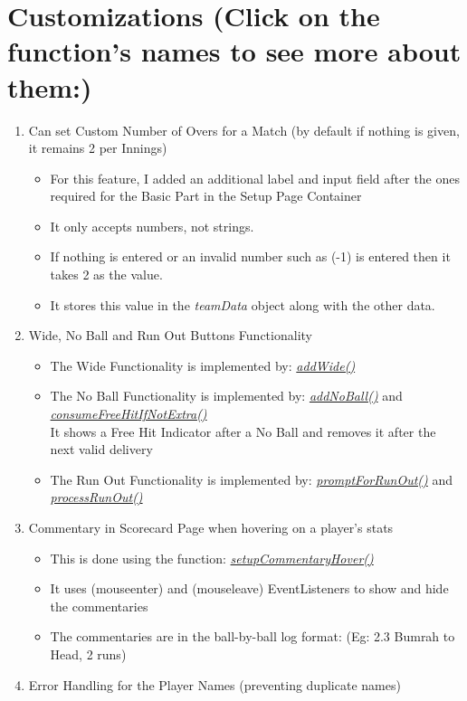 \documentclass[a4paper,12pt]{article}
\begin{document}
\section{Customizations (Click on the function's names to see more about them:)}
\begin{enumerate}
\item Can set Custom Number of Overs for a Match (by default if nothing is given, it remains 2 per Innings)
  \begin{itemize}
  \item For this feature, I added an additional label and input field after the ones required for the Basic Part in the Setup Page Container
  \item It only accepts numbers, not strings.
  \item If nothing is entered or an invalid number such as (-1) is entered then it takes 2 as the value.
  \item It stores this value in the \textit{teamData} object along with the other data.
  \end{itemize}
\item Wide, No Ball and Run Out Buttons Functionality 
  \begin{itemize}
  \item The Wide Functionality is implemented by: \hyperref[wide]{\textit{addWide()}} 
  \item The No Ball Functionality is implemented by: \hyperref[noBall1]{\textit{addNoBall()}} and \hyperref[noBall2]{\textit{consumeFreeHitIfNotExtra()}} \\ It shows a Free Hit Indicator after a No Ball and removes it after the next valid delivery
  \item The Run Out Functionality is implemented by: \hyperref[runOut1]{\textit{promptForRunOut()}} and \hyperref[runOut2]{\textit{processRunOut()}}
  \end{itemize}
\item Commentary in Scorecard Page when hovering on a player's stats
  \begin{itemize}
  \item This is done using the function: \hyperref[commentaryHover]{\textit{setupCommentaryHover()}}
  \item It uses (mouseenter) and (mouseleave) EventListeners to show and hide the commentaries
  \item The commentaries are in the ball-by-ball log format: (Eg: 2.3 Bumrah to Head, 2 runs) 
  \end{itemize}
\item Error Handling for the Player Names (preventing duplicate names)

\end{enumerate}
\end{document}
